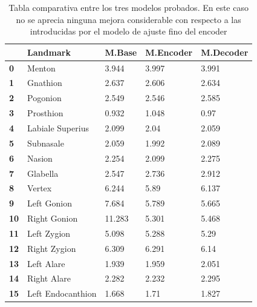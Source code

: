        \begin{table}[!ht]
            \centering
            \caption{Tabla comparativa entre los tres modelos probados. En este caso no se aprecia ninguna mejora considerable con respecto a las introducidas por el modelo de ajuste fino del encoder}
            \begin{tabular}{|l|l|l|l|l|}
            \hline
                \textbf{} & \textbf{Landmark} & \textbf{M.Base} & \textbf{M.Encoder} & \textbf{M.Decoder} \\ \hline
                \textbf{0} & Menton & 3.944 & 3.997 & \cellcolor{green!25} 3.991 \\ \hline
                \textbf{1} & Gnathion & 2.637 & \cellcolor{green!25} 2.606 & 2.634 \\ \hline
                \textbf{2} & Pogonion & 2.549 & \cellcolor{green!25} 2.546 & 2.585 \\ \hline
                \textbf{3} & Prosthion & \cellcolor{green!25} 0.932 & 1.048 & 0.97 \\ \hline
                \textbf{4} & Labiale Superius & 2.099 & \cellcolor{green!25} 2.04 & 2.059 \\ \hline
                \textbf{5} & Subnasale & 2.059 & \cellcolor{green!25} 1.992 & 2.089 \\ \hline
                \textbf{6} & Nasion & 2.254 & \cellcolor{green!25} 2.099 & 2.275 \\ \hline
                \textbf{7} & Glabella & \cellcolor{green!25} 2.547 & 2.736 & 2.912 \\ \hline
                \textbf{8} & Vertex & 6.244 & \cellcolor{green!25} 5.89 & 6.137 \\ \hline
                \textbf{9} & Left Gonion & 7.684 & 5.789 & \cellcolor{green!25} 5.665 \\ \hline
                \textbf{10} & Right Gonion & 11.283 & \cellcolor{green!25} 5.301 & 5.468 \\ \hline
                \textbf{11} & Left Zygion & \cellcolor{green!25} 5.098 & 5.288 & 5.29 \\ \hline
                \textbf{12} & Right Zygion & 6.309 & 6.291 & \cellcolor{green!25} 6.14 \\ \hline
                \textbf{13} & Left Alare & \cellcolor{green!25} 1.939 & 1.959 & 2.051 \\ \hline
                \textbf{14} & Right Alare & 2.282 & \cellcolor{green!25} 2.232 & 2.295 \\ \hline
                \textbf{15} & Left Endocanthion & \cellcolor{green!25} 1.668 & 1.71 & 1.827 \\ \hline

\end{tabular}
\end{table}
